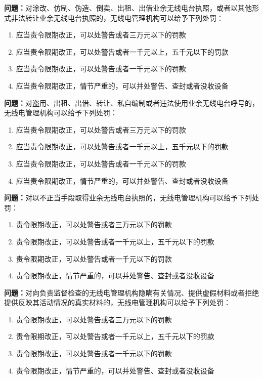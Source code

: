 \noindent\textbf{问题：}对涂改、仿制、伪造、倒卖、出租、出借业余无线电台执照，或者以其他形式非法转让业余无线电台执照的，无线电管理机构可以给予下列处罚：
\begin{enumerate}[label=\Alph*), leftmargin=3em]
\item 应当责令限期改正，可以处警告或者三万元以下的罚款
\item 应当责令限期改正，可以处警告或者一千元以上，五千元以下的罚款
\item 应当责令限期改正，可以处警告或者一千元以下的罚款
\item 应当责令限期改正，情节严重的，可以并处警告、查封或者没收设备
\end{enumerate}

\bigskip


\noindent\textbf{问题：}对盗用、出租、出借、转让、私自编制或者违法使用业余无线电台呼号的，无线电管理机构可以给予下列处罚：
\begin{enumerate}[label=\Alph*), leftmargin=3em]
\item 应当责令限期改正，可以处警告或者三万元以下的罚款
\item 应当责令限期改正，可以处警告或者一千元以上，五千元以下的罚款
\item 应当责令限期改正，可以处警告或者一千元以下的罚款
\item 应当责令限期改正，情节严重的，可以并处警告、查封或者没收设备
\end{enumerate}

\bigskip


\noindent\textbf{问题：}对以不正当手段取得业余无线电台执照的，无线电管理机构可以给予下列处罚：
\begin{enumerate}[label=\Alph*), leftmargin=3em]
\item 责令限期改正，可以处警告或者三万元以下的罚款
\item 责令限期改正，可以处警告或者一千元以上，五千元以下的罚款
\item 责令限期改正，可以处警告或者一千元以下的罚款
\item 责令限期改正，情节严重的，可以并处警告、查封或者没收设备
\end{enumerate}

\bigskip


\noindent\textbf{问题：}对向负责监督检查的无线电管理机构隐瞒有关情况、提供虚假材料或者拒绝提供反映其活动情况的真实材料的，无线电管理机构可以给予下列处罚：
\begin{enumerate}[label=\Alph*), leftmargin=3em]
\item 责令限期改正，可以处警告或者三万元以下的罚款
\item 责令限期改正，可以处警告或者一千元以上，五千元以下的罚款
\item 责令限期改正，可以处警告或者一千元以下的罚款
\item 责令限期改正，情节严重的，可以并处警告、查封或者没收设备
\end{enumerate}

